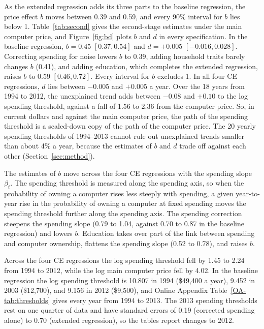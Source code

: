 \documentclass[11pt]{article}
\begin{document}
As the extended regression adds its three parts to the baseline regression, the price effect $b$ moves between 0.39 and 0.59, and every 90\% interval for $b$ lies below 1. Table~\ref{tab:second} gives the second-stage estimates under the main computer price, and Figure~\ref{fig:bd} plots $b$ and $d$ in every specification. In the baseline regression, $b = 0.45$ $[0.37, 0.54]$ and $d = +0.005$ $[-0.016, 0.028]$. Correcting spending for noise lowers $b$ to 0.39, adding household traits barely changes $b$ (0.41), and adding education, which completes the extended regression, raises $b$ to 0.59 $[0.46, 0.72]$. Every interval for $b$ excludes 1. In all four CE regressions, $d$ lies between $-0.005$ and $+0.005$ a year. Over the 18 years from 1994 to 2012, the unexplained trend adds between $-0.08$ and $+0.10$ to the log spending threshold, against a fall of 1.56 to 2.36 from the computer price. So, in current dollars and against the main computer price, the path of the spending threshold is a scaled-down copy of the path of the computer price. The 20 yearly spending thresholds of 1994--2013 cannot rule out unexplained trends smaller than about 4\% a year, because the estimates of $b$ and $d$ trade off against each other (Section~\ref{sec:method}).

The estimates of $b$ move across the four CE regressions with the spending slope $\beta_t$. The spending threshold is measured along the spending axis, so when the probability of owning a computer rises less steeply with spending, a given year-to-year rise in the probability of owning a computer at fixed spending moves the spending threshold further along the spending axis. The spending correction steepens the spending slope (0.79 to 1.04, against 0.70 to 0.87 in the baseline regression) and lowers $b$. Education takes over part of the link between spending and computer ownership, flattens the spending slope (0.52 to 0.78), and raises $b$.

Across the four CE regressions the log spending threshold fell by 1.45 to 2.24 from 1994 to 2012, while the log main computer price fell by 4.02. In the baseline regression the log spending threshold is 10.807 in 1994 (\$49{,}400 a year), 9.452 in 2003 (\$12{,}700), and 9.156 in 2012 (\$9{,}500), and Online Appendix Table~\ref{OA-tab:thresholds} gives every year from 1994 to 2013. The 2013 spending thresholds rest on one quarter of data and have standard errors of 0.19 (corrected spending alone) to 0.70 (extended regression), so the tables report changes to 2012.
\end{document}

